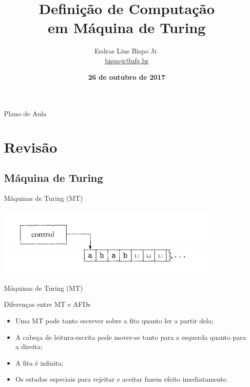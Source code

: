 \documentclass[xcolor=dvipsnames,table]{beamer}
\title{Definição de Computação \\em Máquina de Turing}
\author{
  Esdras Lins Bispo Jr. \\ \url{bispojr@ufg.br}
  }
\institute{
  Teoria da Computação \\Bacharelado em Ciência da Computação}
\date{\textbf{26 de outubro de 2017} }
\begin{document}
	\begin{frame}
		\titlepage
	\end{frame}

	\AtBeginSection{
		\begin{frame}{Sumário}%
    		\tableofcontents[currentsection]
		\end{frame}
	}

	\begin{frame}{Plano de Aula}
		\tableofcontents
	\end{frame}
	
	
	\section{Revisão}
	\subsection{Máquina de Turing}	
	\begin{frame}{Máquinas de Turing (MT)}
		\begin{center}
			\includegraphics[height=3.5cm]{images/fig31.png}
		\end{center}
	\end{frame}
	
	\begin{frame}{Máquinas de Turing (MT)}
		\begin{block}{Diferenças entre MT e AFDs}
			\begin{itemize}
				\item Uma MT pode tanto escrever sobre a fita quanto ler a partir dela;  
				\item A cabeça de leitura-escrita pode mover-se tanto para a esquerda quanto para a direita;  
				\item A fita é infinita;  
				\item Os estados especiais para rejeitar e aceitar fazem efeito imediatamente.
			\end{itemize}
		\end{block}
	\end{frame}
	
\end{document}

